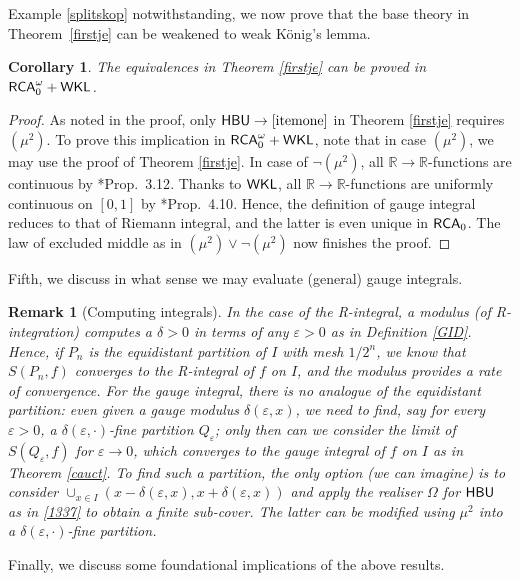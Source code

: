 \documentclass[reqno]{amsart}
\newtheorem{cor}[thm]{Corollary}
\newtheorem{rem}[thm]{Remark}
\def\RCA{\textup{\textsf{RCA}}}
\def\RCAo{\textup{\textsf{RCA}}_{0}^{\omega}}
\def\WKL{\textup{\textsf{WKL}}}
\def\R{{\mathbb  R}}
\def\di{\rightarrow}
\def\HBU{\textup{\textsf{HBU}}}
\def\eps{\varepsilon}
\def\SCF{\textup{\textsf{SCF}}}
\numberwithin{equation}{section}
\numberwithin{thm}{section}
\begin{document}
Example \ref{splitskop} notwithstanding, we now prove that the base theory in Theorem~\ref{firstje} can be weakened to weak K\"onig's lemma. 
\begin{cor}
The equivalences in Theorem \ref{firstje} can be proved in $\RCAo+\WKL$. 
\end{cor}
\begin{proof}
As noted in the proof, only $\HBU\di \eqref{itemone}$ in Theorem \ref{firstje} requires $(\mu^{2})$.   
To prove this implication in $\RCAo+\WKL$, note that in case $(\mu^{2})$, we may use the proof of Theorem \ref{firstje}.
In case of $\neg(\mu^{2})$, all $\R\di \R$-functions are continuous by \cite{kohlenbach2}*{Prop.\ 3.12}.  
Thanks to $\WKL$, all $\R\di \R$-functions are uniformly continuous on $[0,1]$ by \cite{kohlenbach4}*{Prop.\ 4.10}. 
Hence, the definition of gauge integral reduces to that of Riemann integral, and the latter is even unique in $\RCA_{0}$. 
The law of excluded middle as in $(\mu^{2})\vee \neg(\mu^{2})$ now finishes the proof.
\end{proof}
Fifth, we discuss in what sense we may evaluate (general) gauge integrals. 
\begin{rem}[Computing integrals]\label{engauged}\rm
In the case of the R-integral, a modulus (of R-integration) computes a $\delta>0$ in terms of any $\eps>0$ as in Definition \ref{GID}.  
Hence, if $P_{n}$ is the equidistant partition of $I$ with mesh $1/2^{n}$, we know that $S(P_{n}, f)$ converges to the R-integral of $f$ on $I$, and 
the modulus provides a rate of convergence.  For the gauge integral, there is no analogue of the equidistant partition: even given a gauge modulus $\delta(\eps, x)$, 
we need to find, say for every $\eps>0$, a $\delta(\eps, \cdot)$-fine partition $Q_{\eps}$; only then can we consider the limit of $S(Q_{\eps}, f)$ for $\eps\di 0$, which converges to 
the gauge integral of $f$ on $I$ as in Theorem \ref{cauct}.  To find such a partition, the only option (we can imagine) is to consider $\cup_{x\in I}(x-\delta(\eps, x), x+\delta(\eps, x))$ and apply the realiser $\Omega$ for $\HBU$ as in \eqref{1337} to obtain   
a finite sub-cover.  The latter can be modified using $\mu^{2}$ into a $\delta(\eps, \cdot)$-fine partition.  %
\end{rem}
Finally, we discuss some foundational implications of the above results.  
\end{document}

